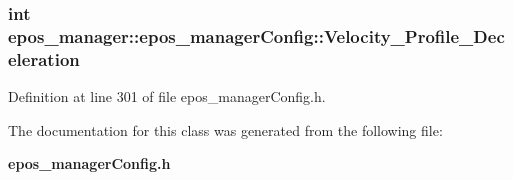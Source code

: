 \subsubsection[{\-Velocity\-\_\-\-Profile\-\_\-\-Deceleration}]{\setlength{\rightskip}{0pt plus 5cm}int {\bf epos\-\_\-manager\-::epos\-\_\-manager\-Config\-::\-Velocity\-\_\-\-Profile\-\_\-\-Deceleration}}\label{classepos__manager_1_1epos__managerConfig_a6f844ebb3a7814046486b6e16eb4cd02}


\-Definition at line 301 of file epos\-\_\-manager\-Config.\-h.



\-The documentation for this class was generated from the following file\-:\begin{DoxyCompactItemize}
\item 
{\bf epos\-\_\-manager\-Config.\-h}\end{DoxyCompactItemize}
